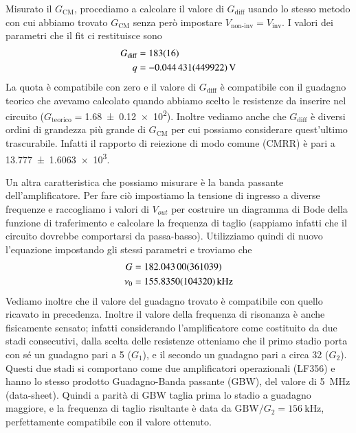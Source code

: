 \documentclass[
    rmp,
    reprint, 
    superscriptaddress, 
    altaffilletter, 
    amsmath, 
    amssymb,
    a4paper]{revtex4-2}
\begin{document}
Misurato il $G_{\text{CM}}$, procediamo a calcolare il valore di $G_{\text{diff}}$ usando lo stesso metodo con cui abbiamo trovato $G_{\text{CM}}$ senza però impostare $V_{\text{non-inv}}=V_{\text{inv}}$. I valori dei parametri che il fit ci restituisce sono
\begin{align*}
    G_{\text{diff}} &=\num[round-mode=none]{183+-16} \\
    q &=\SI{-0.044431+-0.449922}{\volt} \\
\end{align*}
La quota è compatibile con zero e il valore di $G_{\text{diff}}$ è compatibile con il guadagno teorico che avevamo calcolato quando abbiamo scelto le resistenze da inserire nel circuito ($G_{\text{teorico}}=$\num{1.68 +- 0.12e2}). Inoltre vediamo anche che $G_{\text{diff}}$ è diversi ordini di grandezza più grande di $G_{\text{CM}}$ per cui possiamo considerare quest'ultimo trascurabile. Infatti il rapporto di reiezione di modo comune (CMRR) è pari a \num{13.777+-1.6063e3}.

Un altra caratteristica che possiamo misurare è la banda passante dell'amplificatore. Per fare ciò impostiamo la tensione di ingresso a diverse frequenze e raccogliamo i valori di $V_{out}$ per costruire un diagramma di Bode della funzione di traferimento e calcolare la frequenza di taglio (sappiamo infatti che il circuito dovrebbe comportarsi da passa-basso). Utilizziamo quindi di nuovo l'equazione  impostando gli stessi parametri e troviamo che 
\begin{align*}
    G     &=\num{ 182.043 +-  3.61039} \\
    \nu_0 &=\SI{ 155.835 +-  10.4320}{\kilo\hertz} \\ 
\end{align*}
Vediamo inoltre che il valore del guadagno trovato è compatibile con quello ricavato in precedenza. 
Inoltre il valore della frequenza di risonanza è anche fisicamente sensato; infatti considerando l'amplificatore come costituito da due stadi consecutivi, dalla scelta delle resistenze otteniamo che il primo stadio porta con sé un guadagno pari a 5 ($G_{1}$), e il secondo un guadagno pari a circa 32 ($G_{2}$). Questi due stadi si comportano come due amplificatori operazionali (LF356) e hanno lo stesso prodotto Guadagno-Banda passante (GBW), del valore di \SI{5}{\mega\hertz} (data-sheet). Quindi a parità di GBW taglia prima lo stadio a guadagno maggiore, e la frequenza di taglio risultante è data da $\text{GBW}/G_{2} = \SI{156}{\kilo\hertz}$, perfettamente compatibile con il valore ottenuto.
\end{document}
